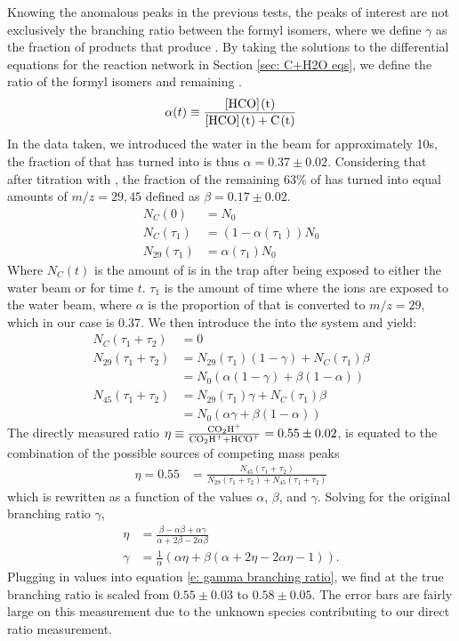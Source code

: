 Knowing the anomalous peaks in the previous tests, the peaks of interest are not exclusively the branching ratio between the formyl isomers, where we define $\gamma$ as the fraction of products that produce . By taking the solutions to the differential equations for the  reaction network in Section \ref{sec: C+H2O eqs}, we define the ratio of the formyl isomers and remaining .
\begin{equation*}
	\alpha(t) \equiv \frac{\ce{[HCO](t)}}{\ce{[HCO](t) + C(t)}}
\end{equation*}
In the data taken, we introduced the water in the beam for approximately 10s, the fraction of  that has turned into \ce{[HCO]+} is thus $\alpha = 0.37 \pm 0.02$. Considering that after titration with , the fraction of the remaining 63\% of  has turned into equal amounts of $m/z=29, 45$ defined as $\beta = 0.17 \pm 0.02$.
\begin{align*}
	N_C(0) & = N_0 \\
	N_C(\tau_1) & = (1-\alpha(\tau_1))N_0 \\
	N_{29}(\tau_1) & = \alpha(\tau_1) N_0
\end{align*}
Where $N_C(t)$ is the amount of  is in the trap after being exposed to either the water beam or  for time $t$. $\tau_1$ is the amount of time where the ions are exposed to the water beam, where $\alpha$ is the proportion of  that is converted to $m/z=29$, which in our case is 0.37. We then introduce the  into the system and yield:
\begin{align*}
	N_C(\tau_1 + \tau_2) & = 0 \\
	N_{29}(\tau_1 + \tau_2) & = N_{29}(\tau_1)(1-\gamma) + N_C(\tau_1)\beta \\
	& = N_0(\alpha(1-\gamma)+\beta(1-\alpha)) \\
	N_{45}(\tau_1 + \tau_2) & = N_{29}(\tau_1)\gamma + N_C(\tau_1)\beta \\
	& = N_0(\alpha \gamma+\beta(1-\alpha))
\end{align*}
The directly measured ratio $\eta \equiv \frac{\ce{CO2H+}}{\ce{CO2H+} + \ce{HCO+}} = 0.55 \pm 0.02$, is equated to the combination of the possible sources of competing mass peaks
\begin{align}
	\eta = 0.55 & = \frac{N_{45}(\tau_1 + \tau_2)}{N_{29}(\tau_1 + \tau_2) + N_{45}(\tau_1 + \tau_2)}
\end{align}
which is rewritten as a function of the values $\alpha$, $\beta$, and $\gamma$. Solving for the original branching ratio $\gamma$,
\begin{align}
	\eta & = \frac{\beta - \alpha \beta + \alpha \gamma}{\alpha + 2\beta - 2\alpha\beta} \nonumber \\
	\gamma & = \frac{1}{\alpha} (\alpha \eta + \beta(\alpha + 2\eta - 2\alpha \eta - 1)). \label{e: gamma branching ratio}
\end{align}
Plugging in values into equation \ref{e: gamma branching ratio}, we find at the true branching ratio is scaled from $0.55 \pm 0.03$ to $0.58 \pm 0.05$. The error bars are fairly large on this measurement due to the unknown species contributing to our direct ratio measurement.

